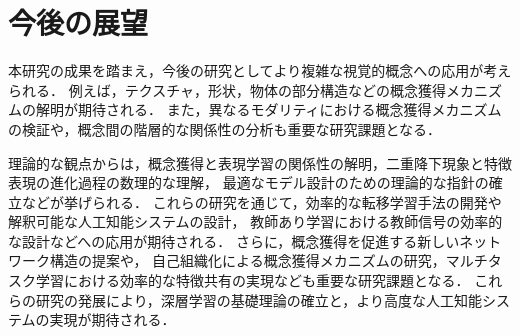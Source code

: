 \chapter{今後の展望}

本研究の成果を踏まえ，今後の研究としてより複雑な視覚的概念への応用が考えられる．
例えば，テクスチャ，形状，物体の部分構造などの概念獲得メカニズムの解明が期待される．
また，異なるモダリティにおける概念獲得メカニズムの検証や，概念間の階層的な関係性の分析も重要な研究課題となる．

理論的な観点からは，概念獲得と表現学習の関係性の解明，二重降下現象と特徴表現の進化過程の数理的な理解，
最適なモデル設計のための理論的な指針の確立などが挙げられる．
これらの研究を通じて，効率的な転移学習手法の開発や解釈可能な人工知能システムの設計，
教師あり学習における教師信号の効率的な設計などへの応用が期待される．
さらに，概念獲得を促進する新しいネットワーク構造の提案や，
自己組織化による概念獲得メカニズムの研究，マルチタスク学習における効率的な特徴共有の実現なども重要な研究課題となる．
これらの研究の発展により，深層学習の基礎理論の確立と，より高度な人工知能システムの実現が期待される．
